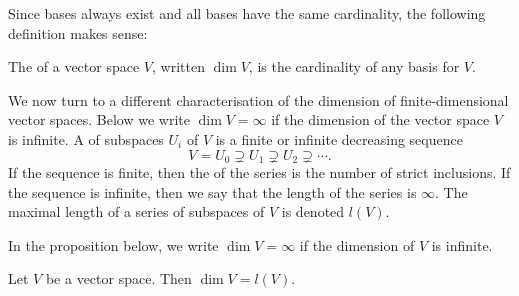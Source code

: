 Since bases always exist and all bases have the same cardinality, the following definition makes sense:

\begin{definition}[Dimension]
    The  of a vector space $V$, written $\dim V$, is the cardinality of any basis for $V$.
\end{definition}


We now turn to a different characterisation of the dimension of finite-dimensional vector spaces. Below we write $\dim V = \infty$ if the dimension of the vector space $V$ is infinite. A  of subspaces $U_i$ of $V$ is a finite or infinite decreasing sequence
%
\begin{equation*}
    V
        = U_0
        \supsetneq U_1
        \supsetneq U_2
        \supsetneq \cdots.
\end{equation*}
%
If the sequence is finite, then the  of the series is the number of strict inclusions. If the sequence is infinite, then we say that the length of the series is $\infty$. The maximal length of a series of subspaces of $V$ is denoted $l(V)$.

In the proposition below, we write $\dim V = \infty$ if the dimension of $V$ is infinite.

\begin{proposition}
    Let $V$ be a vector space. Then $\dim V = l(V)$.
\end{proposition}

